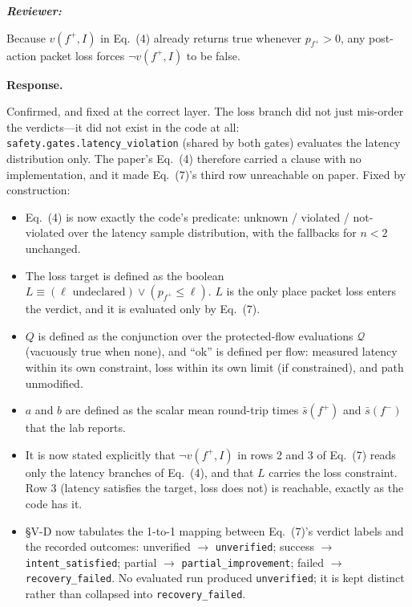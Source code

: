 \documentclass[11pt,a4paper]{article}
\newenvironment{reviewer}{\par\medskip\noindent\begin{minipage}{\linewidth}\small\itshape\color{quote}\textbf{Reviewer:}\par}{\end{minipage}\medskip\par}
\newenvironment{response}{\par\noindent\begin{minipage}{\linewidth}\small\textbf{Response.}\par}{\end{minipage}\medskip\par}
\begin{document}
\begin{reviewer}
Because $v(f^+,I)$ in Eq.~(4) already returns true whenever $p_{f^+} > 0$,
any post-action packet loss forces $\neg v(f^+,I)$ to be false.
\end{reviewer}

\begin{response}
Confirmed, and fixed at the correct layer. The loss branch did not just
mis-order the verdicts---it did not exist in the code at all:
\texttt{safety.gates.latency\_violation} (shared by both gates) evaluates
the latency distribution only. The paper's Eq.~(4) therefore carried a
clause with no implementation, and it made Eq.~(7)'s third row unreachable
on paper. Fixed by construction:

\begin{itemize}
  \item Eq.~(4) is now exactly the code's predicate: unknown / violated /
    not-violated over the latency sample distribution, with the fallbacks for
    $n<2$ unchanged.
  \item The loss target is defined as the boolean $L \equiv
    (\ell \text{ undeclared}) \vee (p_{f^+} \le \ell)$. $L$ is the only
    place packet loss enters the verdict, and it is evaluated only by
    Eq.~(7).
  \item $Q$ is defined as the conjunction over the protected-flow
    evaluations $\mathcal{Q}$ (vacuously true when none), and ``ok'' is
    defined per flow: measured latency within its own constraint, loss within
    its own limit (if constrained), and path unmodified.
  \item $a$ and $b$ are defined as the scalar mean round-trip times
    $\bar{s}(f^+)$ and $\bar{s}(f^-)$ that the lab reports.
  \item It is now stated explicitly that $\neg v(f^+,I)$ in rows 2 and 3 of
    Eq.~(7) reads only the latency branches of Eq.~(4), and that $L$ carries
    the loss constraint. Row 3 (latency satisfies the target, loss does not)
    is reachable, exactly as the code has it.
  \item §V-D now tabulates the 1-to-1 mapping between Eq.~(7)'s verdict
    labels and the recorded outcomes: unverified $\rightarrow$
    \texttt{unverified}; success $\rightarrow$ \texttt{intent\_satisfied};
    partial $\rightarrow$ \texttt{partial\_improvement}; failed
    $\rightarrow$ \texttt{recovery\_failed}. No evaluated run produced
    \texttt{unverified}; it is kept distinct rather than collapsed into
    \texttt{recovery\_failed}.
\end{itemize}
\end{response}
\end{document}
